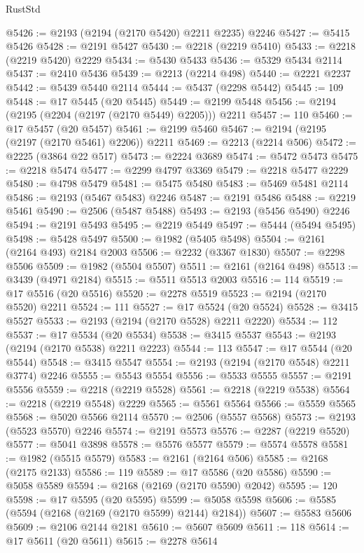 \begin{lexlean}{RustStd}
\begin{coremodule}
{\begin{coremodule}
{{{{{{{{{{{{{{{{{{{{{{{{{{@5426 := @2193 (@2194 (@2170 @5420) @2211 @2235) @2246
@5427 := @5415 @5426
@5428 := @2191 @5427
@5430 := @2218 (@2219 @5410)
@5433 := @2218 (@2219 @5420) @2229
@5434 := @5430 @5433
@5436 := @5329 @5434 @2114
@5437 := @2410 @5436
@5439 := @2213 (@2214 @498)
@5440 := @2221 @2237
@5442 := @5439 @5440 @2114
@5444 := @5437 (@2298 @5442)
@5445 := 109
@5448 := @17 @5445 (@20 @5445)
@5449 := @2199 @5448
@5456 := @2194 (@2195 (@2204 (@2197 (@2170 @5449) @2205))) @2211
@5457 := 110
@5460 := @17 @5457 (@20 @5457)
@5461 := @2199 @5460
@5467 := @2194 (@2195 (@2197 (@2170 @5461) @2206)) @2211
@5469 := @2213 (@2214 @506)
@5472 := @2225 (@3864 @22 @517)
@5473 := @2224 @3689
@5474 := @5472 @5473
@5475 := @2218 @5474
@5477 := @2299 @4797 @3369
@5479 := @2218 @5477 @2229
@5480 := @4798 @5479
@5481 := @5475 @5480
@5483 := @5469 @5481 @2114
@5486 := @2193 (@5467 @5483) @2246
@5487 := @2191 @5486
@5488 := @2219 @5461
@5490 := @2506 (@5487 @5488)
@5493 := @2193 (@5456 @5490) @2246
@5494 := @2191 @5493
@5495 := @2219 @5449
@5497 := @5444 (@5494 @5495)
@5498 := @5428 @5497
@5500 := @1982 (@5405 @5498)
@5504 := @2161 (@2164 @493) @2184 @2003
@5506 := @2232 (@3367 @1830)
@5507 := @2298 @5506
@5509 := @1982 (@5504 @5507)
@5511 := @2161 (@2164 @498)
@5513 := @3439 (@4971 @2184)
@5515 := @5511 @5513 @2003
@5516 := 114
@5519 := @17 @5516 (@20 @5516)
@5520 := @2278 @5519
@5523 := @2194 (@2170 @5520) @2211
@5524 := 111
@5527 := @17 @5524 (@20 @5524)
@5528 := @3415 @5527
@5533 := @2193 (@2194 (@2170 @5528) @2211 @2220)
@5534 := 112
@5537 := @17 @5534 (@20 @5534)
@5538 := @3415 @5537
@5543 := @2193 (@2194 (@2170 @5538) @2211 @2223)
@5544 := 113
@5547 := @17 @5544 (@20 @5544)
@5548 := @3415 @5547
@5554 := @2193 (@2194 (@2170 @5548) @2211 @3774) @2246
@5555 := @5543 @5554
@5556 := @5533 @5555
@5557 := @2191 @5556
@5559 := @2218 (@2219 @5528)
@5561 := @2218 (@2219 @5538)
@5564 := @2218 (@2219 @5548) @2229
@5565 := @5561 @5564
@5566 := @5559 @5565
@5568 := @5020 @5566 @2114
@5570 := @2506 (@5557 @5568)
@5573 := @2193 (@5523 @5570) @2246
@5574 := @2191 @5573
@5576 := @2287 (@2219 @5520)
@5577 := @5041 @3898
@5578 := @5576 @5577
@5579 := @5574 @5578
@5581 := @1982 (@5515 @5579)
@5583 := @2161 (@2164 @506)
@5585 := @2168 (@2175 @2133)
@5586 := 119
@5589 := @17 @5586 (@20 @5586)
@5590 := @5058 @5589
@5594 := @2168 (@2169 (@2170 @5590) @2042)
@5595 := 120
@5598 := @17 @5595 (@20 @5595)
@5599 := @5058 @5598
@5606 := @5585 (@5594 (@2168 (@2169 (@2170 @5599) @2144) @2184))
@5607 := @5583 @5606
@5609 := @2106 @2144 @2181
@5610 := @5607 @5609
@5611 := 118
@5614 := @17 @5611 (@20 @5611)
@5615 := @2278 @5614
}}}}}}}}}}}}}}}}}}}}}}}}}}
\end{coremodule}}
\end{coremodule}
\end{lexlean}

